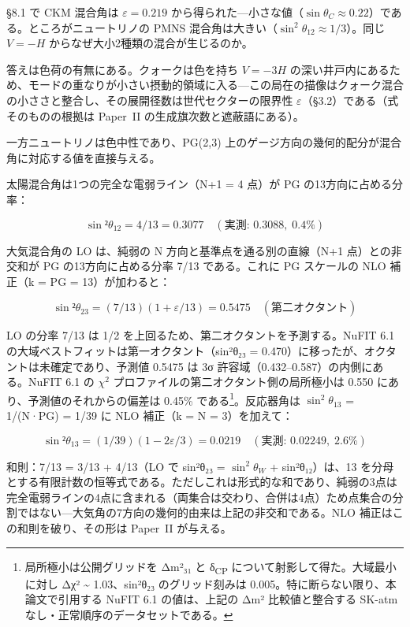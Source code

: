\documentclass[fontsize=11pt,paper=a4,lualatex]{jlreq}
\begin{document}
§8.1 で CKM 混合角は $\varepsilon = 0.219$ から得られた---小さな値（$\sin\theta_C \approx 0.22$）である。ところがニュートリノの PMNS 混合角は大きい（$\sin^2\theta_{12} \approx 1/3$）。同じ $V = -H$ からなぜ大小2種類の混合が生じるのか。

答えは色荷の有無にある。クォークは色を持ち $V = -3H$ の深い井戸内にあるため、モードの重なりが小さい摂動的領域に入る---この局在の描像はクォーク混合の小ささと整合し、その展開径数は世代セクターの限界性 $\varepsilon$（§3.2）である（式そのものの根拠は Paper~II の生成旗次数と遮蔽語にある）。

一方ニュートリノは色中性であり、PG(2,3) 上のゲージ方向の幾何的配分が混合角に対応する値を直接与える。

太陽混合角は1つの完全な電弱ライン（N+1 = 4 点）が PG
の13方向に占める分率：

\[\sin²θ_{12} = 4/13 = 0.3077 \quad (\text{実測: } 0.3088,\; 0.4\%)\]

大気混合角の LO は、純弱の N 方向と基準点を通る別の直線（N+1 点）との非交和が PG の13方向に占める分率 7/13 である。これに PG スケールの NLO 補正（k
= \textbar PG\textbar{} = 13）が加わると：

\[\sin²θ_{23} = (7/13)(1 + ε/13) = 0.5475 \quad (\text{第二オクタント})\]

LO の分率 7/13 は 1/2
を上回るため、第二オクタントを予測する。NuFIT 6.1 \cite{nufit} の大域ベストフィットは第一オクタント（sin²θ₂₃ = 0.470）に移ったが、オクタントは未確定であり、予測値 0.5475 は 3σ 許容域（0.432--0.587）の内側にある。NuFIT 6.1 の $\chi^2$ プロファイルの第二オクタント側の局所極小は 0.550 にあり、予測値のそれからの偏差は 0.45\% である\footnote{局所極小は公開グリッドを Δm²₃₁ と δ\textsubscript{CP} について射影して得た。大域最小に対し Δχ² \textasciitilde{} 1.03、sin²θ₂₃ のグリッド刻みは 0.005。特に断らない限り、本論文で引用する NuFIT 6.1 の値は、上記の Δm² 比較値と整合する SK-atm なし・正常順序のデータセットである。}。反応器角は $\sin^2\!\theta_{13}$ = 1/(N·\textbar PG\textbar) = 1/39 に NLO
補正（k = N = 3）を加えて：

\[\sin²θ_{13} = (1/39)(1 - 2ε/3) = 0.0219 \quad (\text{実測: } 0.02249,\; 2.6\%)\]

和則：7/13 = 3/13 + 4/13（LO で sin²θ₂₃ = $\sin^2\!\theta_W$ + sin²θ₁₂）は、13 を分母とする有限計数の恒等式である。ただしこれは形式的な和であり、純弱の3点は完全電弱ラインの4点に含まれる（両集合は交わり、合併は4点）ため点集合の分割ではない---大気角の7方向の幾何的由来は上記の非交和である。NLO 補正はこの和則を破り、その形は Paper~II が与える。
\end{document}
